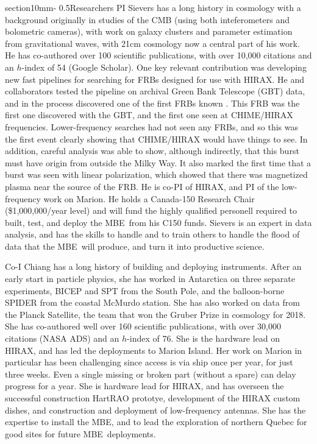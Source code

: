 \documentclass[letterpaper,11pt,preprint]{aastex}
\makeatletter
\newcommand{\mbe}{{\rm MBE}}
\renewcommand{\section}{\@startsection%
{section}{1}{0mm}{-\baselineskip}%
{0.5\baselineskip}{\normalfont\Large\bfseries}}%
\makeatother
\begin{document}
\section{Researchers}
PI Sievers has a long history in cosmology with a background
originally in studies of the CMB (using both inteferometers and
bolometric cameras), with work on galaxy clusters and parameter
estimation from gravitational waves, with 21cm cosmology now a central
part of his work.  He has co-authored over 100 scientific
publications, with over 10,000 citations and an $h$-index of 54
(Google Scholar).  One key relevant contribution was developing new
fast pipelines for searching for FRBs designed for use with HIRAX.  He
and collaborators tested the pipeline on archival Green Bank Telescope
(GBT) data, and in the process discovered one of the first FRBs known
\citep{Masui15}.  This FRB was the first one discovered with the GBT,
and the first one seen at CHIME/HIRAX frequencies.  Lower-frequency
searches had not seen any FRBs, and so this was the first event
clearly showing that CHIME/HIRAX would have things to see.  In
addition, careful analysis was able to show, although indirectly, that
this burst must have origin from outside the Milky Way.  It also
marked the first time that a burst was seen with linear polarization,
which showed that there was magnetized plasma near the source of the
FRB.  He is co-PI of HIRAX, and PI of the low-frequency work on
Marion.  He holds a Canada-150 Research Chair (\$1,000,000/year level)
and will fund the highly qualified personell required to built, test,
and deploy the \mbe\ from his C150 funds.  Sievers is an expert in
data analysis, and has the skills to handle and to train others to
handle the flood of data that the \mbe\ will produce, and turn it into
productive science.

Co-I Chiang has a long history of building and deploying instruments.
After an early start in particle physics, she has worked in Antarctica
on three separate experiments, BICEP and SPT from the South Pole, and
the balloon-borne SPIDER from the coastal McMurdo station.  She has also
worked on data from the Planck Satellite, the team that won the Gruber
Prize in cosmology for 2018.  She has co-authored well
over 160 scientific publications, with over 30,000 citations (NASA
ADS) and an $h$-index of 76.  She is the hardware lead on
HIRAX, and has led the deployments to Marion Island.  Her work on
Marion in particular has been challenging since access is via ship
once per year, for just three weeks.  Even a single missing or broken
part (without a spare) can delay progress for a year.  She is hardware
lead for HIRAX, and has overseen the successful construction HartRAO
prototye, development of the HIRAX custom dishes, and construction and
deployment of low-frequency antennas.  She has the expertise to
install the \mbe, and to lead the exploration of northern Quebec for
good sites for future \mbe\ deployments.
\end{document}

